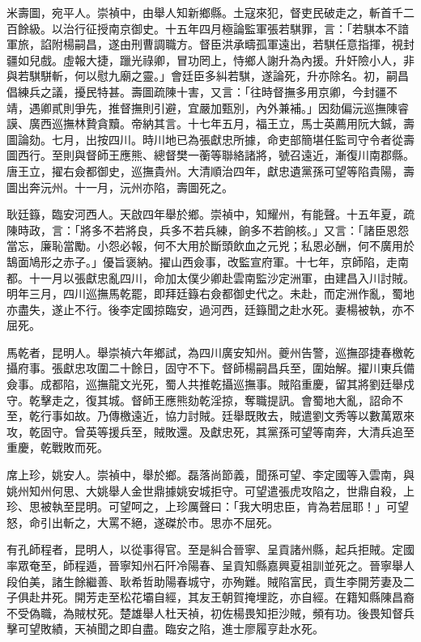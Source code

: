 \begin{pinyinscope}
米壽圖，宛平人。崇禎中，由舉人知新鄉縣。土寇來犯，督吏民破走之，斬首千二百餘級。以治行征授南京御史。十五年四月極論監軍張若騏罪，言：「若騏本不諳軍旅，諂附楊嗣昌，遂由刑曹調職方。督臣洪承疇孤軍遠出，若騏任意指揮，視封疆如兒戲。虛報大捷，躐光祿卿，冒功罔上，恃鄉人謝升為內援。升奸險小人，非與若騏駢斬，何以慰九廟之靈。」會廷臣多糾若騏，遂論死，升亦除名。初，嗣昌倡練兵之議，擾民特甚。壽圖疏陳十害，又言：「往時督撫多用京卿，今封疆不靖，遇卿貳則爭先，推督撫則引避，宜嚴加甄別，內外兼補。」因劾偏沅巡撫陳睿謨、廣西巡撫林贄貪黷。帝納其言。十七年五月，福王立，馬士英薦用阮大鋮，壽圖論劾。七月，出按四川。時川地已為張獻忠所據，命吏部簡堪任監司守令者從壽圖西行。至則與督師王應熊、總督樊一蘅等聯絡諸將，號召遠近，漸復川南郡縣。唐王立，擢右僉都御史，巡撫貴州。大清順治四年，獻忠遺黨孫可望等陷貴陽，壽圖出奔沅州。十一月，沅州亦陷，壽圖死之。

耿廷籙，臨安河西人。天啟四年舉於鄉。崇禎中，知耀州，有能聲。十五年夏，疏陳時政，言：「將多不若將良，兵多不若兵練，餉多不若餉核。」又言：「諸臣恩怨當忘，廉恥當勵。小怨必報，何不大用於斷頭飲血之元兇；私恩必酬，何不廣用於鵠面鳩形之赤子。」優旨褒納。擢山西僉事，改監宣府軍。十七年，京師陷，走南都。十一月以張獻忠亂四川，命加太僕少卿赴雲南監沙定洲軍，由建昌入川討賊。明年三月，四川巡撫馬乾罷，即拜廷籙右僉都御史代之。未赴，而定洲作亂，蜀地亦盡失，遂止不行。後李定國掠臨安，過河西，廷籙聞之赴水死。妻楊被執，亦不屈死。

馬乾者，昆明人。舉崇禎六年鄉試，為四川廣安知州。夔州告警，巡撫邵捷春檄乾攝府事。張獻忠攻圍二十餘日，固守不下。督師楊嗣昌兵至，圍始解。擢川東兵備僉事。成都陷，巡撫龍文光死，蜀人共推乾攝巡撫事。賊陷重慶，留其將劉廷舉戍守。乾擊走之，復其城。督師王應熊劾乾淫掠，奪職提訊。會蜀地大亂，詔命不至，乾行事如故。乃傳檄遠近，協力討賊。廷舉既敗去，賊遣劉文秀等以數萬眾來攻，乾固守。曾英等援兵至，賊敗還。及獻忠死，其黨孫可望等南奔，大清兵追至重慶，乾戰敗而死。

席上珍，姚安人。崇禎中，舉於鄉。磊落尚節義，聞孫可望、李定國等入雲南，與姚州知州何思、大姚舉人金世鼎據姚安城拒守。可望遣張虎攻陷之，世鼎自殺，上珍、思被執至昆明。可望呵之，上珍厲聲曰：「我大明忠臣，肯為若屈耶！」可望怒，命引出斬之，大罵不絕，遂磔於市。思亦不屈死。

有孔師程者，昆明人，以從事得官。至是糾合晉寧、呈貢諸州縣，起兵拒賊。定國率眾奄至，師程遁，晉寧知州石阡冷陽春、呈貢知縣嘉興夏祖訓並死之。晉寧舉人段伯美，諸生餘繼善、耿希哲助陽春城守，亦殉難。賊陷富民，貢生李開芳妻及二子俱赴井死。開芳走至松花壩自經，其友王朝賀掩埋訖，亦自經。在籍知縣陳昌裔不受偽職，為賊杖死。楚雄舉人杜天禎，初佐楊畏知拒沙賊，頻有功。後畏知督兵擊可望敗績，天禎聞之即自盡。臨安之陷，進士廖履亨赴水死。


\end{pinyinscope}
